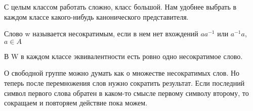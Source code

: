 С целым классом работать сложно, класс большой. Нам удобнее выбрать в каждом классе какого-нибудь 
канонического представителя.
\begin{Def}
Слово w называется несократимым, если в нем
нет вхождений $aa^{-1}$ или $a^{-1}a$, $a \in A$\\
\end{Def}   
\begin{theorem}
В W в каждом классе эквивалентности есть ровно одно несократимое слово.
\end{theorem}
\begin{Rem}
О свободной группе можно думать как о множестве несократимых слов.
Но теперь после перемножения слов нужно сократить результат.
Если последний символ первого слова обратен в каком-то смысле первому символу второму, то 
сокращаем и повторяем действие пока можем.
\end{Rem}
